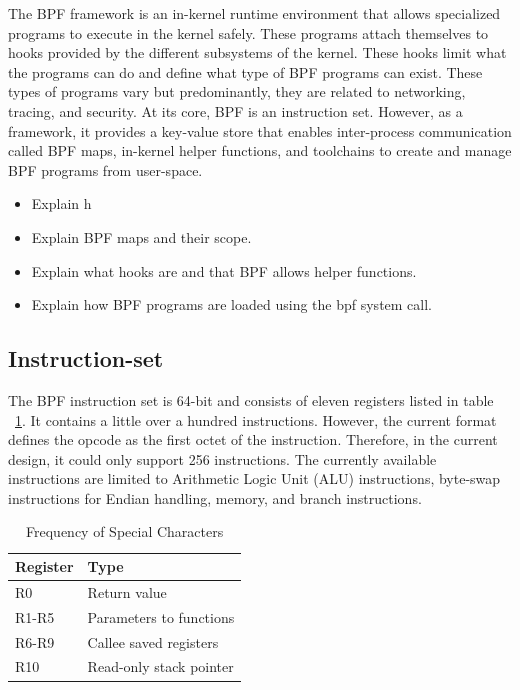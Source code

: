 \documentclass[sigconf, nonacm]{acmart}
\begin{document}
The BPF framework is an in-kernel runtime environment that allows specialized
programs to execute in the kernel safely. These programs attach themselves to
hooks provided by the different subsystems of the kernel. These hooks limit what
the programs can do and define what type of BPF programs can exist. These types
of programs vary but predominantly, they are related to networking, tracing, and
security. At its core, BPF is an instruction set. However, as a framework, it
provides a key-value store that enables inter-process communication called BPF
maps, in-kernel helper functions, and toolchains to create and manage BPF
programs from user-space.


\begin{itemize}
  \item Explain h
  \item Explain BPF maps and their scope.
  \item Explain what hooks are and that BPF allows helper functions.
  \item Explain how BPF programs are loaded using the bpf system call.
\end{itemize}


\subsection{Instruction-set}


The BPF instruction set is 64-bit and consists of eleven registers listed in
table ~\ref{table:BPF_registers}. It contains a little over a hundred
instructions. However, the current format defines the opcode as the first octet
of the instruction. Therefore, in the current design, it could only support 256
instructions. The currently available instructions are limited to Arithmetic
Logic Unit (ALU) instructions, byte-swap instructions for Endian handling,
memory, and branch instructions.

\begin{table}
  \caption{Frequency of Special Characters}
  \label{table:BPF_registers}
  \begin{tabular}{ll}
    \toprule
    Register & Type                    \\
    \midrule
    R0       & Return value            \\
    R1-R5    & Parameters to functions \\
    R6-R9    & Callee saved registers  \\
    R10      & Read-only stack pointer \\
    \bottomrule
\end{tabular}
\end{table}
\end{document}
